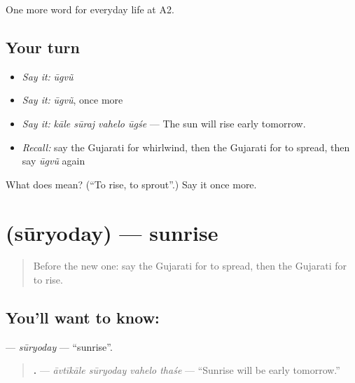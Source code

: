 \begin{grammarlens}[title={What you've built}]
One more word for everyday life at A2.
\end{grammarlens}

\subsection*{Your turn}
\begin{itemize}
\raggedright
  \item \emph{Say it:} \emph{ūgvũ}
  \item \emph{Say it:} \emph{ūgvũ}, once more
  \item \emph{Say it:} \emph{kāle sūraj vahelo ūgśe} — The sun will rise early tomorrow.
  \item \emph{Recall:} say the Gujarati for whirlwind, then the Gujarati for to spread, then say \emph{ūgvũ} again
\end{itemize}

\begin{tcolorbox}[breakable,colback=teal!4,colframe=teal!35!black,title={Before you move on}]
What does  mean? (\textquotedblleft{}To rise, to sprout\textquotedblright{}.) Say it once more.
\end{tcolorbox}
\section[\texorpdfstring{\gu{સૂર્યોદય} (sūryoday)}{સૂર્યોદય (sūryoday)}]{ (sūryoday) — sunrise}

\label{lesson:GU-C218-suryoday}



\begin{quote}
Before the new one: say the Gujarati for to spread, then the Gujarati for to rise.
\end{quote}

\subsection*{You'll want to know: }
\textbf{} — \emph{sūryoday} — \textquotedblleft{}sunrise\textquotedblright{}.

\begin{quote}
\textbf{   .} — \emph{āvtīkāle sūryoday vahelo thaśe} — \textquotedblleft{}Sunrise will be early tomorrow.\textquotedblright{}
\end{quote}

